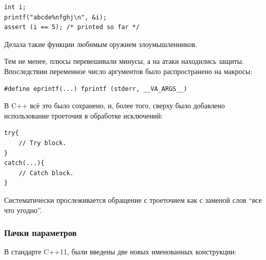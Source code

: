 \documentclass[a4paper,12pt,oneside]{article}
\begin{document}
\begin{lstlisting}
int i;
printf("abcde%nfghj\n", &i);
assert (i == 5); /* printed so far */
\end{lstlisting}

Делала такие функции любимым оружием злоумышленников. 

Тем не менее, плюсы перевешивали минусы, а на атаки находились защиты. Впоследствии переменное число аргументов было распространено на макросы:

\begin{lstlisting}
#define eprintf(...) fprintf (stderr, __VA_ARGS__)
\end{lstlisting}

В C++ всё это было сохранено, и, более того, сверху было добавлено использование троеточия в обработке исключений:

\begin{lstlisting}
try{
    // Try block.
}
catch(...){
    // Catch block.
}
\end{lstlisting}

Систематически прослеживается обращение с троеточием как с заменой слов ``все что угодно''.

\subsubsection{Пачки параметров}\label{ParamPack}

В стандарте C++11, были введены две новых именованных конструкции: 
\end{document}
